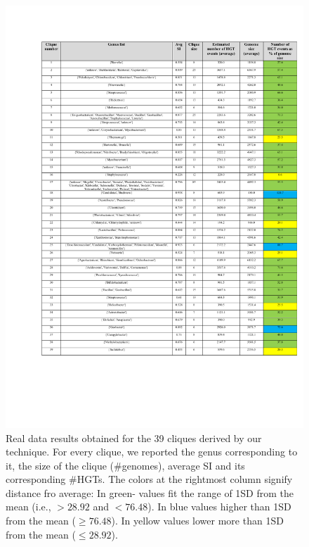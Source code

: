 \documentclass[runningheads, 11pt]{llncs}
\begin{document}
\begin{figure}[h]
\vspace{-1in}
\hspace{-.9901cm}
\includegraphics[scale=1,angle=0]{figs/real-data-table1.pdf} 
\caption{\small Real data results obtained for the 39 cliques derived by our
technique. For every clique, we reported the genus corresponding to it, the size
of the clique (\#genomes), average SI and its corresponding \#HGTs. The colors 
at the rightmost column signify distance fro average: In green- values fit the
range of 1SD from the mean (i.e., $>28.92$ and $<76.48$). In blue values higher
than 1SD from the mean ($\geq 76.48$). In yellow values lower more than 1SD from the
mean ($\leq 28.92$). \label{fig-real-data-table}}
\end{figure}
\end{document}
